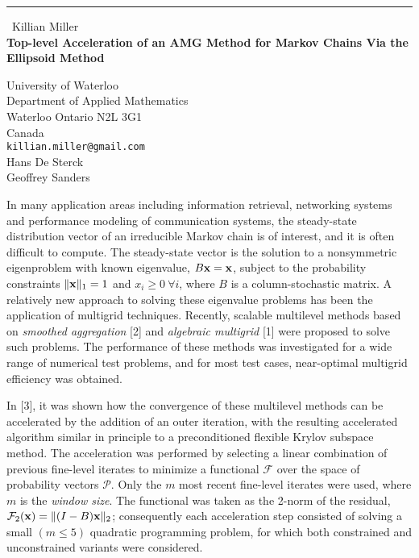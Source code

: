 \documentclass{report}
\begin{document}
\begin{center}
\rule{6in}{1pt} \
{\large Killian Miller \\
{\bf Top-level Acceleration of an AMG Method for Markov Chains Via the Ellipsoid Method}}

University of Waterloo \\ Department of Applied Mathematics \\ Waterloo Ontario N2L 3G1 \\ Canada
\\
{\tt killian.miller@gmail.com}\\
Hans De Sterck\\
Geoffrey Sanders\end{center}

\newcommand{\mF}{\mathcal{F}}
\newcommand{\mP}{\mathcal{P}}
\newcommand{\mV}{\mathcal{V}}
\newcommand{\bx}{{\bf x}}

In many application areas including information retrieval, networking
systems and performance modeling of communication systems, the
steady-state distribution vector of an irreducible Markov chain is of
interest, and it is often difficult to compute. The steady-state vector
is the solution to a nonsymmetric eigenproblem with known eigenvalue,
$B\bx = \bx$, subject to the probability constraints $\|\bx\|_1 = 1$ and
$x_i \geq 0~\forall i$, where $B$ is a column-stochastic matrix. A
relatively new approach to solving these eigenvalue problems has been the
application of multigrid techniques. Recently, scalable multilevel
methods based on {\em smoothed aggregation} [2] and {\em algebraic
multigrid} [1] were proposed to solve such problems. The performance of
these methods was investigated for a wide range of numerical test
problems, and for most test cases, near-optimal multigrid efficiency was
obtained.

In [3], it was shown how the convergence of these multilevel methods can
be accelerated by the addition of an outer iteration, with the resulting
accelerated algorithm similar in principle to a preconditioned flexible
Krylov subspace method. The acceleration was performed by selecting a
linear combination of previous fine-level iterates to minimize a
functional $\mF$
over the space of probability vectors $\mP$. Only the $m$ most recent
fine-level iterates were used, where $m$ is the {\em window size}. The
functional was taken as the 2-norm of the residual, $\mF_2(\bx) =
\|(I-B)\bx\|_2$; consequently each acceleration step consisted of solving
a small $(m \leq 5)$ quadratic programming problem, for which both
constrained and unconstrained variants were considered.
\end{document}
